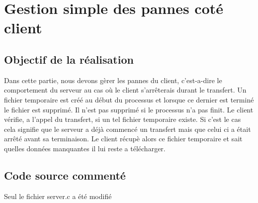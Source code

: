 \documentclass{report}
\begin{document}
    \chapter{Gestion simple des pannes cot\'e client}
      \section{Objectif de la r\'ealisation}
	Dans cette partie, nous devons g\`erer les pannes du client, c'est-a-dire le comportement du serveur au cas o\`u le client s'arr\^eterais durant le transfert. Un fichier temporaire est cr\'e\'e au début du processus et lorsque ce dernier est termin\'e le fichier est supprim\'e. Il n'est pas supprim\'e si le processus n'a pas finit. Le client v\'erifie, a l'appel du transfert, si un tel fichier temporaire existe. Si c'est le cas cela signifie que le serveur a d\'ej\`a commenc\'e un transfert mais que celui ci a \'etait arr\^et\'e avant sa terminaison. Le client r\'ecup\`e alors ce fichier temporaire et sait quelles donn\'ees manquantes il lui reste a t\'el\'echarger. \\
      \section{Code source comment\'e}
      Seul le fichier server.c a \'et\'e modifi\'e
\end{document}
